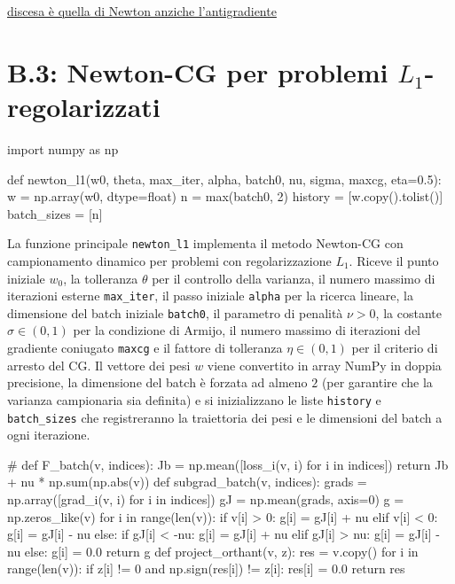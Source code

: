 \documentclass[italian, a4paper, twoside, binding=6mm]{sapthesis}
\begin{document}
 \underline{discesa è quella di Newton anziche l'antigradiente}
\section{B.3: Newton-CG per problemi $L_1$-regolarizzati}
\begin{pythoncode}[title= Newton-L1]

import numpy as np

def newton_l1(w0, theta, max_iter, alpha, batch0, nu, sigma, maxcg, eta=0.5):
    w = np.array(w0, dtype=float)
    n = max(batch0, 2)
    history     = [w.copy().tolist()]
    batch_sizes = [n]
\end{pythoncode}
La funzione principale \texttt{newton\_l1} implementa il metodo Newton-CG con campionamento dinamico per problemi con regolarizzazione $L_1$. Riceve il punto iniziale $w_0$, la tolleranza $\theta$ per il controllo della varianza, il numero massimo di iterazioni esterne \texttt{max\_iter}, il passo iniziale \texttt{alpha} per la ricerca lineare, la dimensione del batch iniziale \texttt{batch0}, il parametro di penalità $\nu > 0$, la costante $\sigma \in (0,1)$ per la condizione di Armijo, il numero massimo di iterazioni del gradiente coniugato \texttt{maxcg} e il fattore di tolleranza $\eta \in (0,1)$ per il criterio di arresto del CG. Il vettore dei pesi $w$ viene convertito in array NumPy in doppia precisione, la dimensione del batch è forzata ad almeno $2$ (per garantire che la varianza campionaria sia definita) e si inizializzano le liste \texttt{history} e \texttt{batch\_sizes} che registreranno la traiettoria dei pesi e le dimensioni del batch a ogni iterazione.
\begin{pythoncode}[title= Newton-L1]

#
    def F_batch(v, indices):
        Jb = np.mean([loss_i(v, i) for i in indices])
        return Jb + nu * np.sum(np.abs(v))
    def subgrad_batch(v, indices):
        grads = np.array([grad_i(v, i) for i in indices])
        gJ = np.mean(grads, axis=0)
        g = np.zeros_like(v)
        for i in range(len(v)):
            if v[i] > 0:
                g[i] = gJ[i] + nu
            elif v[i] < 0:
                g[i] = gJ[i] - nu
            else:
                if gJ[i] < -nu:
                    g[i] = gJ[i] + nu
                elif gJ[i] > nu:
                    g[i] = gJ[i] - nu
                else:
                    g[i] = 0.0
        return g
    def project_orthant(v, z):
        res = v.copy()
        for i in range(len(v)):
            if z[i] != 0 and np.sign(res[i]) != z[i]:
                res[i] = 0.0
        return res
\end{pythoncode}
\end{document}
